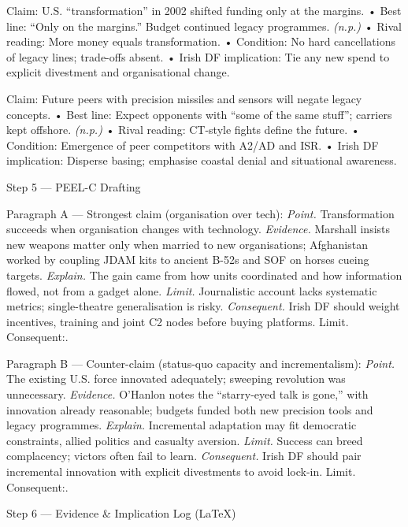 Claim: U.S. “transformation” in 2002 shifted funding only at the margins.
• Best line: “Only on the margins.” Budget continued legacy programmes. \emph{(n.p.)}
• Rival reading: More money equals transformation.
• Condition: No hard cancellations of legacy lines; trade-offs absent.
• Irish DF implication: Tie any new spend to explicit divestment and organisational change.

Claim: Future peers with precision missiles and sensors will negate legacy concepts.
• Best line: Expect opponents with “some of the same stuff”; carriers kept offshore. \emph{(n.p.)}
• Rival reading: CT-style fights define the future.
• Condition: Emergence of peer competitors with A2/AD and ISR.
• Irish DF implication: Disperse basing; emphasise coastal denial and situational awareness.

Step 5 — PEEL-C Drafting

Paragraph A — Strongest claim (organisation over tech):
\textit{Point.} Transformation succeeds when organisation changes with technology.
\textit{Evidence.} Marshall insists new weapons matter only when married to new organisations; Afghanistan worked by coupling JDAM kits to ancient B-52s and SOF on horses cueing targets.
\textit{Explain.} The gain came from how units coordinated and how information flowed, not from a gadget alone.
\textit{Limit.} Journalistic account lacks systematic metrics; single-theatre generalisation is risky.
\textit{Consequent.} Irish DF should weight incentives, training and joint C2 nodes before buying platforms. Limit. Consequent:.

Paragraph B — Counter-claim (status-quo capacity and incrementalism):
\textit{Point.} The existing U.S. force innovated adequately; sweeping revolution was unnecessary.
\textit{Evidence.} O’Hanlon notes the “starry-eyed talk is gone,” with innovation already reasonable; budgets funded both new precision tools and legacy programmes.
\textit{Explain.} Incremental adaptation may fit democratic constraints, allied politics and casualty aversion.
\textit{Limit.} Success can breed complacency; victors often fail to learn.
\textit{Consequent.} Irish DF should pair incremental innovation with explicit divestments to avoid lock-in. Limit. Consequent:.

Step 6 — Evidence & Implication Log (LaTeX)

